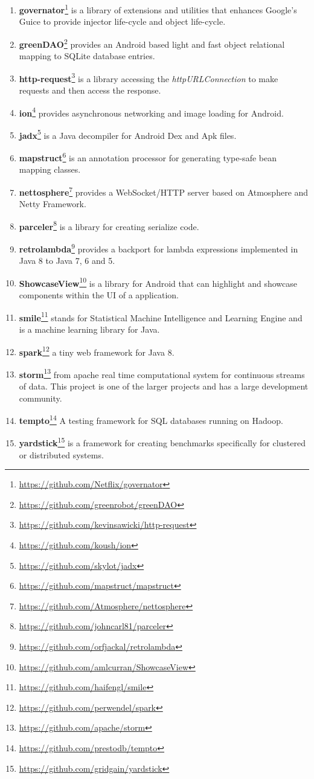 \begin{enumerate}
\item \textbf{governator}\footnote{\url{https://github.com/Netflix/governator}} is a library of extensions and utilities that enhances Google's Guice to provide injector life-cycle and object life-cycle.
\item \textbf{greenDAO}\footnote{\url{https://github.com/greenrobot/greenDAO}} provides an Android based light and fast object relational mapping to SQLite database entries.
\item \textbf{http-request}\footnote{\url{https://github.com/kevinsawicki/http-request}} is a library accessing the \textit{httpURLConnection} to make requests and then access the response.
\item \textbf{ion}\footnote{\url{https://github.com/koush/ion}} provides asynchronous networking and image loading for Android.
\item \textbf{jadx}\footnote{\url{https://github.com/skylot/jadx}} is a Java decompiler for Android Dex and Apk files.
\item \textbf{mapstruct}\footnote{\url{https://github.com/mapstruct/mapstruct}} is an annotation processor for generating type-safe bean mapping classes.
\item \textbf{nettosphere}\footnote{\url{https://github.com/Atmosphere/nettosphere}} provides a WebSocket/HTTP server based on Atmosphere and Netty Framework.
\item \textbf{parceler}\footnote{\url{https://github.com/johncarl81/parceler}} is a library for creating serialize code.
\item \textbf{retrolambda}\footnote{\url{https://github.com/orfjackal/retrolambda}} provides a backport for lambda expressions implemented in Java 8 to Java 7, 6 and 5. 
\item \textbf{ShowcaseView}\footnote{\url{https://github.com/amlcurran/ShowcaseView}} is a library for Android that can highlight and showcase components within the UI of a application.
\item \textbf{smile}\footnote{\url{https://github.com/haifengl/smile}} stands for Statistical Machine Intelligence and Learning Engine and is a machine learning library for Java.
\item \textbf{spark}\footnote{\url{https://github.com/perwendel/spark}} a tiny web framework for Java 8.
\item \textbf{storm}\footnote{\url{https://github.com/apache/storm}} from apache real time computational system for continuous streams of data. This project is one of the larger projects and has a large development community.
\item \textbf{tempto}\footnote{\url{https://github.com/prestodb/tempto}} A testing framework for SQL databases running on Hadoop.
\item \textbf{yardstick}\footnote{\url{https://github.com/gridgain/yardstick}} is a framework for creating benchmarks specifically for clustered or distributed systems.

\end{enumerate}

